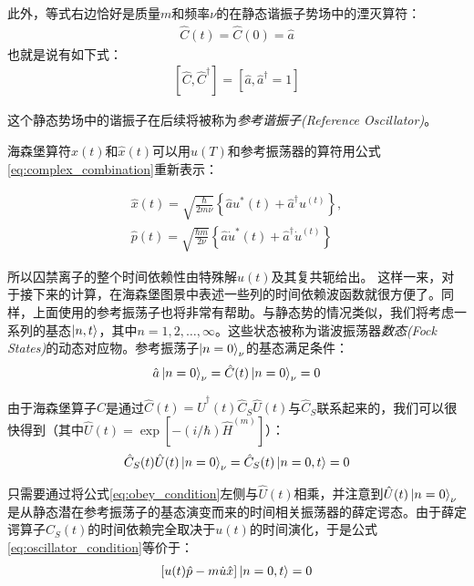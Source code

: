 此外，等式右边恰好是质量$m$和频率$\nu$的在静态谐振子势场中的湮灭算符：
\begin{align}
    \hat{C}(t)=\hat{C}(0)=\hat{a}
\end{align}
也就是说有如下式：
\begin{align}
    \left[\hat{C},\hat{C}^\dagger\right]=\left[\hat{a},\hat{a}^\dagger=1\right]
\end{align}

这个静态势场中的谐振子在后续将被称为\emph{参考谐振子(Reference Oscillator)}。

海森堡算符$\hat{x}(t)$和$\hat{x}(t)$可以用$u(T)$和参考振荡器的算符用公式\eqref{eq:complex_combination}重新表示：

\begin{align}
    \hat{x}(t)=\sqrt{\frac{\hbar}{2m\nu}}\left\{\hat{a}u^*(t)+\hat{a}^\dagger u^(t)\right\},\\
    \hat{p}(t)=\sqrt{\frac{\hbar m}{2\nu}}\left\{\hat{a}\dot{u}^*(t)+\hat{a}^\dagger \dot{u}^(t)\right\}
\end{align}

所以囚禁离子的整个时间依赖性由特殊解$u(t)$及其复共轭给出。
这样一来，对于接下来的计算，在海森堡图景中表述一些列的时间依赖波函数就很方便了。同样，上面使用的参考振荡子也将非常有帮助。与静态势的情况类似，我们将考虑一系列的基态$\ket{n,t}$，其中$n=1,2,\dots,\infty$。这些状态被称为谐波振荡器\emph{数态(Fock States)}的动态对应物。参考振荡子$\ket{n=0}_\nu$的基态满足条件：
\begin{align}
    \hat{a}\ket{n=0}_\nu=\hat{C}(t)\ket{n=0}_\nu=0 \label{eq:obey_condition}
\end{align}

由于海森堡算子$\hat{C}$是通过$\hat{C}(t)=\hat{U}^\dagger(t)\hat{C}_S\hat{U}(t)$与$\hat{C}_S$联系起来的，我们可以很快得到（其中$\hat{U}(t)=\exp{\left[-(i/\hbar)\hat{H}^{(m)}\right]}$）：
\begin{align}
    \hat{C}_S(t)\hat{U}(t)\ket{n=0}_\nu=\hat{C}_S(t)\ket{n=0,t}=0 \label{eq:oscillator_condition}
\end{align}

只需要通过将公式\eqref{eq:obey_condition}左侧与$\hat{U}(t)$相乘，并注意到$\hat{U}(t)\ket{n=0}_\nu$是从静态潜在参考振荡子的基态演变而来的时间相关振荡器的薛定谔态。由于薛定谔算子$C_S(t)$的时间依赖完全取决于$u(t)$的时间演化，于是公式\eqref{eq:oscillator_condition}等价于：
\begin{align}
    \left[u(t)\hat{p}-m\dot{u}\hat{x}\right]\ket{n=0,t}=0
\end{align}

